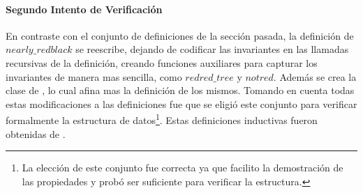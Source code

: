 \paragraph{Segundo Intento de Verificaci\'on}
En contraste con el conjunto de definiciones de la secci\'on pasada, la definici\'on de
\hyperref[inductive_isRedB]{$nearly\_redblack$} se reescribe, dejando de codificar las invariantes 
en las llamadas recursivas de la definición, creando funciones auxiliares para capturar los 
invariantes de manera mas sencilla, como \hyperref[inductive_isRedB]{$redred\_tree$} y $notred$. 
Además se crea la clase de {\arns}, lo cual afina mas la definici\'on de los mismos. Tomando en 
cuenta todas estas modificaciones a las definiciones fue que se eligió este conjunto para verificar 
formalmente la estructura de datos\footnote{La elecci\'on de este conjunto fue correcta ya que 
facilito la demostraci\'on de las propiedades y prob\'o ser suficiente para verificar la estructura.}. 
Estas definiciones inductivas fueron obtenidas de \cite{MSetRBT}.
